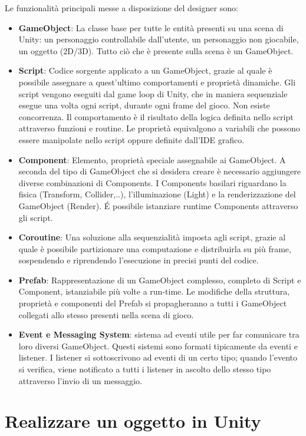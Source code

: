 Le funzionalità principali messe a disposizione del designer sono:
\begin{itemize}
	\item \textbf{GameObject}: La classe base per tutte le entità presenti su una scena di Unity: un personaggio controllabile dall'utente, un personaggio non giocabile, un oggetto (2D/3D). Tutto ciò che è presente sulla scena è un GameObject.
	\item \textbf{Script}: Codice sorgente applicato a un GameObject, grazie al quale è possibile assegnare a quest'ultimo comportamenti e proprietà dinamiche. Gli script vengono eseguiti dal game loop di Unity, che in maniera sequenziale esegue una volta ogni script, durante ogni frame del gioco. Non esiste concorrenza. Il comportamento è il risultato della logica definita nello script attraverso funzioni e routine. Le proprietà equivalgono a variabili che possono essere manipolate nello script oppure definite dall'IDE grafico.
	\item \textbf{Component}: Elemento, proprietà speciale assegnabile ai GameObject. A seconda del tipo di GameObject che si desidera creare è necessario aggiungere diverse combinazioni di Components. I Components basilari riguardano la fisica (Transform, Collider,..), l'illuminazione (Light) e la renderizzazione del GameObject (Render). \'E possibile istanziare runtime Components attraverso gli script.
	\item \textbf{Coroutine}: Una soluzione alla sequenzialità imposta agli script, grazie al quale è possibile partizionare una computazione e distribuirla su più frame, sospendendo e riprendendo l'esecuzione in precisi punti del codice.
	\item \textbf{Prefab}: Rappresentazione di un GameObject complesso, completo di Script e Component, istanziabile più volte a run-time. Le modifiche della struttura, proprietà e componenti del Prefab si propagheranno a tutti i GameObject collegati allo stesso presenti nella scena di gioco.
	\item \textbf{Event e Messaging System}: sistema ad eventi utile per far comunicare tra loro diversi GameObject. Questi sistemi sono formati tipicamente da eventi e listener. I listener si sottoscrivono ad eventi di un certo tipo; quando l'evento si verifica, viene notificato a tutti i listener in ascolto dello stesso tipo attraverso l'invio di un messaggio.
\end{itemize}

\section{Realizzare un oggetto in Unity} \label{ambiente_unity}

